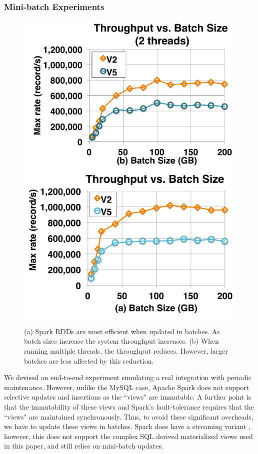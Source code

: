 \subsubsection{Mini-batch Experiments}
\begin{figure}[t]
\centering
 \includegraphics[scale=0.14]{exp/con_1.pdf}
 \includegraphics[scale=0.14]{exp/con_2.pdf}
 \caption{(a) Spark RDDs are most efficient when updated in batches. As batch sizes increase the system throughput increases. (b) When running multiple threads, the throughput reduces. However, larger batches are less affected by this reduction. \label{conv-2}}
\end{figure}

We devised an end-to-end experiment simulating a real integration with periodic maintenance.
However, unlike the MySQL case, Apache Spark does not support selective updates and insertions as the ``views" are immutable.
A further point is that the immutability of these views and Spark's fault-tolerance requires that the ``views" are maintained synchronously.
Thus, to avoid these significant overheads, we have to update these views in batches.
Spark does have a streaming variant \cite{zaharia2012discretized}, however, this does not support the complex SQL derived materialized views used in this paper, and still relies on mini-batch updates.

